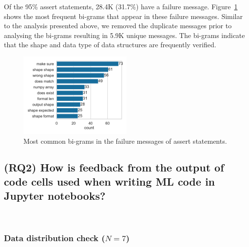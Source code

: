 Of the 95\% assert statements, 28.4K (31.7\%) have a failure message. Figure~\ref{fig:common-assert-msgs} shows the most frequent bi-grams that appear in these failure messages. Similar to the analysis presented above, we removed the duplicate messages prior to analysing the bi-grams resulting in 5.9K unique messages. The bi-grams indicate that the shape and data type of data structures are frequently verified.

\begin{figure}
  \centering
  \includegraphics[width=0.5\textwidth]{common-assert-msgs.pdf}
  \caption{Most common bi-grams in the failure messages of assert statements.}
  \label{fig:common-assert-msgs}
\end{figure}

\subsection{(RQ2) How is feedback from the output of code cells used when writing ML code in Jupyter notebooks?}~\label{sec:result-rq1}

\subsubsection{Data distribution check ($N = 7$)}~\label{sec:data-distribution-output}

